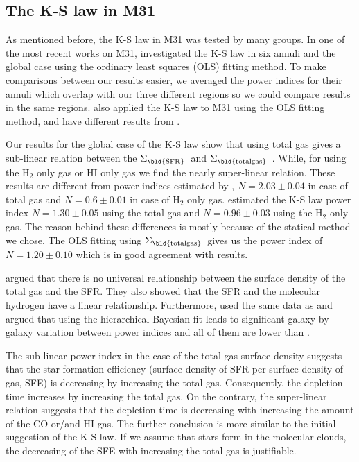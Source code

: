 \documentclass[useAMS,usenatbib]{mn2e}
\newcommand \sigmatotalgas {$\Sigma_{\rm \bld {total gas }} $\ }
\newcommand \sigmasfr     {$\Sigma_{\rm \bld {SFR }} $\ }
\begin{document}
\subsection{The K-S law in M31}

As mentioned before, the K-S law in M31 was tested by many groups. In one of the most recent works on M31, \cite{Ford13} investigated the K-S law in six annuli and the global case using the ordinary least squares (OLS) fitting method. To make comparisons between our results easier, we averaged the power indices for their annuli which overlap with our three different regions so we could compare results in the same regions.
\cite{Tabatabaei10} also applied the K-S law to M31 using the OLS fitting method, and have different results from \cite{Ford13}.

Our results for the global case of the K-S law show that using total gas gives a sub-linear relation between the \sigmasfr and \sigmatotalgas. While, for using the H$_{2}$ only gas or HI only gas we find the nearly super-linear relation. These results are different from power indices estimated by \cite{Ford13}, $N=2.03\pm0.04$ in case of total gas and $N=0.6\pm0.01$ in case of H$_{2}$ only gas. \cite{Tabatabaei10} estimated the K-S law power index $N=1.30\pm0.05$ using the total gas and $N=0.96\pm0.03$ using the H$_{2}$ only gas. The reason behind these differences is mostly because of the statical method we chose. The OLS fitting using \sigmatotalgas gives us the power index of $N=1.20\pm0.10$ which is in good agreement with \cite{Tabatabaei10} results.

 \cite{Bigiel08} argued that there is no universal relationship between the surface density of the total gas and the SFR. They also showed that the SFR and the molecular hydrogen have a linear relationship. Furthermore, \cite{Shetty13} used the same data as \cite{Bigiel08} and argued that using the hierarchical Bayesian fit leads to significant galaxy-by-galaxy variation between power indices and all of them are lower than \cite{Bigiel08}. 

The sub-linear power index in the case of the total gas surface density suggests that the star formation efficiency (surface density of SFR per surface density of gas, SFE) is decreasing by increasing the total gas. Consequently, the depletion time increases by increasing the total gas. On the contrary, the super-linear relation suggests that the depletion time is decreasing with increasing the amount of the CO or/and HI gas. The further conclusion is more similar to the initial suggestion of the K-S law. If we assume that stars form in the molecular clouds, the decreasing of the SFE with increasing the total gas is justifiable.  
\end{document}
